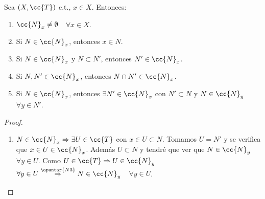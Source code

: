 \begin{prop}\label{proposicion1_11}
    Sea $(X,\cc{T})$ e.t., $x\in X$. Entonces:
    \begin{enumerate}
        \item[\objetivo{N1}] $\cc{N}_x \neq \emptyset$\ \ $\forall x \in X$.
        \item[\objetivo{N2}] Si $N \in \cc{N}_x$, entonces $x\in N$.
        \item[\objetivo{N3}] Si $N \in \cc{N}_x$ y $N\subset N'$, entonces $N'\in \cc{N}_x$.
        \item[\objetivo{N4}] Si $N,N'\in \cc{N}_x$, entonces $N\cap N' \in \cc{N}_x$.
        \item[\objetivo{N5}] Si $N\in \cc{N}_x$, entonces $\exists N'\in \cc{N}_x$ con $N'\subset N$ y $N\in \cc{N}_y$\ \ $\forall y \in N'$.  
    \end{enumerate}
    \begin{proof}\
        \begin{enumerate}
            \item[\apuntar{N5}] $N\in \cc{N}_x\Rightarrow \exists U \in \cc{T}$ con $x\in U\subset N$. Tomamos $U=N'$ y se verifica que $x\in U \in \cc{N}_x$. Además $U\subset N$ y tendré que ver que $N\in \cc{N}_y$\ \ $\forall y \in U$. Como $U\in \cc{T}\Rightarrow U\in \cc{N}_y$\ \ $\forall y \in U \overset{\apuntar{N3}}{\Rightarrow} N\in \cc{N}_y$\ \ $\forall y \in U$.
        \end{enumerate}
    \end{proof}
\end{prop}

